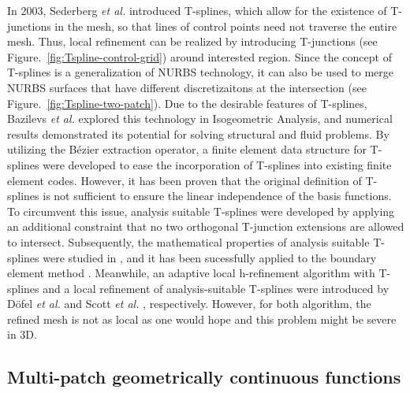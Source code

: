 In 2003, Sederberg \textit{et al.} \cite{sederberg_t-splines_2003} introduced T-splines, which allow for the existence of T-junctions in the mesh, so that lines of control points need not traverse the entire mesh. Thus, local refinement can be realized by introducing T-junctions (see Figure.~\ref{fig:Tspline-control-grid}) around interested region. Since the concept of T-splines is a generalization of NURBS technology, it can also be used to merge NURBS surfaces that have different discretizaitons at the intersection (see Figure.~\ref{fig:Tspline-two-patch}). Due to the desirable features of T-splines, Bazilevs \textit{et al.} \cite{bazilevs_isogeometric_2010} explored this technology in Isogeometric Analysis, and numerical results demonstrated its potential for solving structural and fluid problems. By utilizing the B\'ezier extraction operator, a finite element data structure for T-splines \cite{scott_isogeometric_2011} were developed to ease the incorporation of T-splines into existing finite element codes. However, it has been proven \cite{buffa_linear_2010} that the original definition of T-splines is not sufficient to ensure the linear independence of the basis functions. To circumvent this issue, analysis suitable T-splines \cite{li_linear_2012} were developed by applying an additional constraint that no two orthogonal T-junction extensions are allowed to intersect. Subsequently, the mathematical properties of analysis suitable T-splines were studied in \cite{li_analysis-suitable_2013,xin_li_properties_2015}, and it has been sucessfully applied to the boundary element method \cite{scott2013isogeometric}. Meanwhile, an adaptive local h-refinement algorithm with T-splines and a local refinement of analysis-suitable T-splines were introduced by D\"{o}fel \textit{et al.} \cite{dorfel_adaptive_2010} and Scott \textit{et al.} \cite{scott_local_2012}, respectively. However, for both algorithm, the refined mesh is not as local as one would hope and this problem might be severe in 3D.\par

\subsection{Multi-patch geometrically continuous functions}

